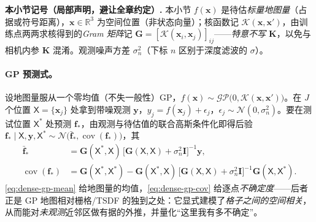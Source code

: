 \begin{note}
\textbf{本小节记号（局部声明，避让全章约定）.}\;
本小节 $f(\mathbf{x})$ 是待估\emph{标量地图量}（占据或符号距离），$\mathbf{x}\in\mathbb{R}^3$ 为空间位置（非状态向量）；核函数记 $\mathcal{K}(\mathbf{x},\mathbf{x}')$，由训练点两两求核得到的\emph{Gram 矩阵}记 $\mathbf{G}=[\mathcal{K}(\mathbf{x}_i,\mathbf{x}_j)]_{ij}$——\emph{特意不写 $\mathbf{K}$}，以免与相机内参 $\mathbf{K}$ 混淆。观测噪声方差 $\sigma_n^2$（下标 $n$ 区别于深度滤波的 $\sigma$）。
\end{note}

\paragraph{GP 预测式。}
设地图量服从一个零均值（不失一般性）GP，$f(\mathbf{x})\sim\mathcal{GP}\!\bigl(0,\mathcal{K}(\mathbf{x},\mathbf{x}')\bigr)$。在 $J$ 个位置 $\mathsf{X}=\{\mathbf{x}_j\}$ 处拿到带噪观测 $\mathbf{y}$，$y_j=f(\mathbf{x}_j)+\epsilon_j$，$\epsilon_j\sim\mathcal{N}(0,\sigma_n^2)$。要在测试位置 $\mathsf{X}^\ast$ 处预测 $\mathbf{f}_\ast$，由观测与待估值的联合高斯条件化即得后验 $\mathbf{f}_\ast\mid\mathsf{X},\mathbf{y},\mathsf{X}^\ast\sim\mathcal{N}\!\bigl(\bar{\mathbf{f}}_\ast,\operatorname{cov}(\mathbf{f}_\ast)\bigr)$，其
\begin{align}
  \bar{\mathbf{f}}_\ast &= \mathbf{G}(\mathsf{X}^\ast,\mathsf{X})\,\bigl[\mathbf{G}(\mathsf{X},\mathsf{X})+\sigma_n^2\mathbf{I}\bigr]^{-1}\mathbf{y}, \label{eq:dense-gp-mean}\\
  \operatorname{cov}(\mathbf{f}_\ast) &= \mathbf{G}(\mathsf{X}^\ast,\mathsf{X}^\ast)-\mathbf{G}(\mathsf{X}^\ast,\mathsf{X})\,\bigl[\mathbf{G}(\mathsf{X},\mathsf{X})+\sigma_n^2\mathbf{I}\bigr]^{-1}\mathbf{G}(\mathsf{X},\mathsf{X}^\ast). \label{eq:dense-gp-cov}
\end{align}
\cref{eq:dense-gp-mean} 给地图量的均值，\cref{eq:dense-gp-cov} 给逐点\emph{不确定度}——后者正是 GP 地图相对栅格/TSDF 的独到之处：它显式建模了\emph{格子之间的空间相关}，从而能对\emph{未观测}近邻区做有据的外推，并量化“这里我有多不确定”。

